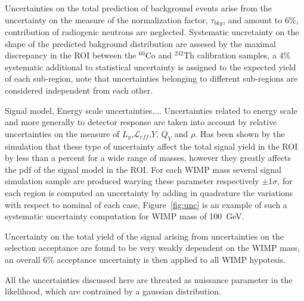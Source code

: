 Uncertainties on the total prediction of background events arise from the uncertainty on the measure of the normalization 
factor, $\tau_{bkg}$, and amount to 6\%, contribution of radiogenic neutrons are neglected. 
Systematic uncretainty on the shape of the predicted bakground distribution are assesed by the maximal discrepancy in the ROI between
the $^{60}$Co and $^{232}$Th calibration samples, a 4\% systematic additional to statistical uncertainty is assigned to the expected yield of each sub-region,
note that uncertainties belonging to different sub-regions are considered independent from each other.

Signal model, Energy scale uncertainties.... Uncertainties related to energy scale and more generally to detector response 
are taken into account by relative uncertainties on the measure of $L_y$,$\mathcal{L}_{eff}$,$Y$, $Q_Y$ and $\rho$. Has been shown 
by the simulation that these type of uncertainty affect the total signal yield in the ROI by less than a percent for a wide range of masses,
however they greatly affects the pdf of the signal model in the ROI. For each WIMP mass several signal simulation sample are produced 
warying these parameter respectively $\pm 1 \sigma$, for each region is computed an uncertainty by adding in quadrature the variations
with respect to nominal of each case, Figure~\ref{fig:unc} is an example of such a systematic uncertainty computation for WIMP mass of 100~GeV.

Uncertainty on the total yield of the signal arising from uncertainties on the selection acceptance are found to be very weakly dependent on 
the WIMP mass, an overall 6\% acceptance uncertainty is then applied to all WIMP hypotesis.

All the uncertainties discussed here are threated as nuissance parameter in the likelihood, which are contrained by a gaussian distribution.


















